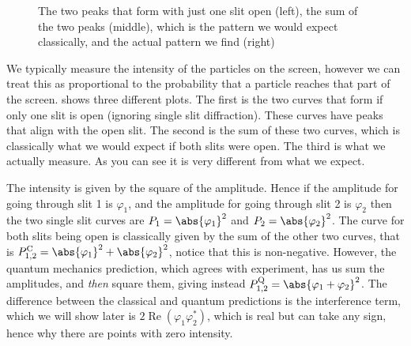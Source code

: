 \documentclass[fleqn]{NotesClass}
\DeclareMathOperator{\Re}{Re}
\begin{document}
    \begin{figure}
        \caption{The two peaks that form with just one slit open (left), the sum of the two peaks (middle), which is the pattern we would expect classically, and the actual pattern we find (right)}
        \label{fig:two slit results}
    \end{figure}
    
    We typically measure the intensity of the particles on the screen, however we can treat this as proportional to the probability that a particle reaches that part of the screen.
     shows three different plots.
    The first is the two curves that form if only one slit is open (ignoring single slit diffraction).
    These curves have peaks that align with the open slit.
    The second is the sum of these two curves, which is classically what we would expect if both slits were open.
    The third is what we actually measure.
    As you can see it is very different from what we expect.
    
    The intensity is given by the square of the amplitude.
    Hence if the amplitude for going through slit 1 is \(\varphi_1\), and the amplitude for going through slit 2 is \(\varphi_2\) then the two single slit curves are \(P_1 = \abs{\varphi_1}^2\) and \(P_2 = \abs{\varphi_2}^2\).
    The curve for both slits being open is classically given by the sum of the other two curves, that is \(P_{1,2}^\mathrm{C} = \abs{\varphi_1}^2 + \abs{\varphi_2}^2\), notice that this is non-negative.
    However, the quantum mechanics prediction, which agrees with experiment, has us sum the amplitudes, and \emph{then} square them, giving instead \(P_{1,2}^\mathrm{Q} = \abs{\varphi_1 + \varphi_2}^2\).
    The difference between the classical and quantum predictions is the interference term, which we will show later is \(2\Re(\varphi_1\varphi_2^*)\), which is real but can take any sign, hence why there are points with zero intensity.
\end{document}

